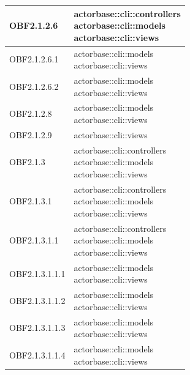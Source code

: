 \documentclass{scalatekids-article}
\begin{document}
\begin{longtable}[H]{|p{3.5cm}|p{7.5cm}|}
  \hline
  OBF2.1.2.6 & \multiLineCell[t]{actorbase::cli::controllers\\actorbase::cli::models\\actorbase::cli::views\\}\\
  \hline
  OBF2.1.2.6.1 & \multiLineCell[t]{actorbase::cli::models\\actorbase::cli::views\\}\\
  \hline
  OBF2.1.2.6.2 & \multiLineCell[t]{actorbase::cli::models\\actorbase::cli::views\\}\\
  \hline
  OBF2.1.2.8 & \multiLineCell[t]{actorbase::cli::models\\actorbase::cli::views\\}\\
  \hline
  OBF2.1.2.9 & \multiLineCell[t]{actorbase::cli::views\\}\\
  \hline
  OBF2.1.3 & \multiLineCell[t]{actorbase::cli::controllers\\actorbase::cli::models\\actorbase::cli::views\\}\\
  \hline
  OBF2.1.3.1 & \multiLineCell[t]{actorbase::cli::controllers\\actorbase::cli::models\\actorbase::cli::views\\}\\
  \hline
  OBF2.1.3.1.1 & \multiLineCell[t]{actorbase::cli::controllers\\actorbase::cli::models\\actorbase::cli::views\\}\\
  \hline
  OBF2.1.3.1.1.1 & \multiLineCell[t]{actorbase::cli::models\\actorbase::cli::views\\}\\
  \hline
  OBF2.1.3.1.1.2 & \multiLineCell[t]{actorbase::cli::models\\actorbase::cli::views\\}\\
  \hline
  OBF2.1.3.1.1.3 & \multiLineCell[t]{actorbase::cli::models\\actorbase::cli::views\\}\\
  \hline
  OBF2.1.3.1.1.4 & \multiLineCell[t]{actorbase::cli::models\\actorbase::cli::views\\}\\

\end{longtable}
\end{document}
